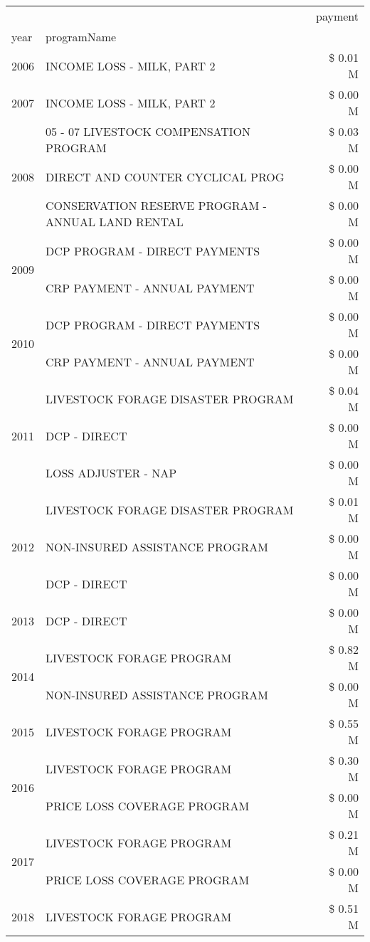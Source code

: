 \begin{tabular}{llr}
\toprule
 &  & payment \\
year & programName &  \\
\midrule
2006 & INCOME LOSS - MILK, PART 2 & \$ 0.01 M \\
\cline{1-3}
2007 & INCOME LOSS - MILK, PART 2 & \$ 0.00 M \\
\cline{1-3}
\multirow[t]{3}{*}{2008} & 05 - 07 LIVESTOCK COMPENSATION PROGRAM & \$ 0.03 M \\
 & DIRECT AND COUNTER CYCLICAL PROG & \$ 0.00 M \\
 & CONSERVATION RESERVE PROGRAM - ANNUAL LAND RENTAL & \$ 0.00 M \\
\cline{1-3}
\multirow[t]{2}{*}{2009} & DCP PROGRAM - DIRECT PAYMENTS & \$ 0.00 M \\
 & CRP PAYMENT - ANNUAL PAYMENT & \$ 0.00 M \\
\cline{1-3}
\multirow[t]{2}{*}{2010} & DCP PROGRAM - DIRECT PAYMENTS & \$ 0.00 M \\
 & CRP PAYMENT - ANNUAL PAYMENT & \$ 0.00 M \\
\cline{1-3}
\multirow[t]{3}{*}{2011} & LIVESTOCK FORAGE DISASTER PROGRAM & \$ 0.04 M \\
 & DCP - DIRECT & \$ 0.00 M \\
 & LOSS ADJUSTER - NAP & \$ 0.00 M \\
\cline{1-3}
\multirow[t]{3}{*}{2012} & LIVESTOCK FORAGE DISASTER PROGRAM & \$ 0.01 M \\
 & NON-INSURED ASSISTANCE PROGRAM & \$ 0.00 M \\
 & DCP - DIRECT & \$ 0.00 M \\
\cline{1-3}
2013 & DCP - DIRECT & \$ 0.00 M \\
\cline{1-3}
\multirow[t]{2}{*}{2014} & LIVESTOCK FORAGE PROGRAM & \$ 0.82 M \\
 & NON-INSURED ASSISTANCE PROGRAM & \$ 0.00 M \\
\cline{1-3}
2015 & LIVESTOCK FORAGE PROGRAM & \$ 0.55 M \\
\cline{1-3}
\multirow[t]{2}{*}{2016} & LIVESTOCK FORAGE PROGRAM & \$ 0.30 M \\
 & PRICE LOSS COVERAGE PROGRAM & \$ 0.00 M \\
\cline{1-3}
\multirow[t]{2}{*}{2017} & LIVESTOCK FORAGE PROGRAM & \$ 0.21 M \\
 & PRICE LOSS COVERAGE PROGRAM & \$ 0.00 M \\
\cline{1-3}
\multirow[t]{3}{*}{2018} & LIVESTOCK FORAGE PROGRAM & \$ 0.51 M \\

\end{tabular}
